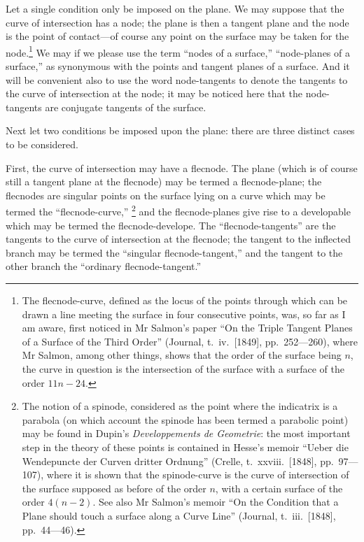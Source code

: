 \documentclass[11pt,a4paper]{book}
\begin{document}
Let a single condition only be imposed on the plane. We may suppose that the curve of intersection has a node; the plane is then a tangent plane and the node is the point of contact---of course any point on the surface may be taken for the node.\footnote{The flecnode-curve, defined as the locus of the points through which can be drawn a line meeting the surface in four consecutive points, was, so far as I am aware, first noticed in Mr Salmon's paper ``On the Triple Tangent Planes of a Surface of the Third Order'' (Journal, t.\ iv.\ [1849], pp.\ 252---260), where Mr Salmon, among other things, shows that the order of the surface being $n$, the curve in question is the intersection of the surface with a surface of the order $11n - 24$.} We may if we please use the term ``nodes of a surface,'' ``node-planes of a surface,'' as synonymous with the points and tangent planes of a surface. And it will be convenient also to use the word node-tangents to denote the tangents to the curve of intersection at the node; it may be noticed here that the node-tangents are conjugate tangents of the surface.

Next let two conditions be imposed upon the plane: there are three distinct cases to be considered.

First, the curve of intersection may have a flecnode. The plane (which is of course still a tangent plane at the flecnode) may be termed a flecnode-plane; the flecnodes are singular points on the surface lying on a curve which may be termed the ``flecnode-curve,''
\footnote{The notion of a spinode, considered as the point where the indicatrix is a parabola (on which account the spinode has been termed a parabolic point) may be found in Dupin's \textit{Developpements de Geometrie}: the most important step in the theory of these points is contained in Hesse's memoir ``Ueber die Wendepuncte der Curven dritter Ordnung'' (Crelle, t.\ xxviii.\ [1848], pp.\ 97---107), where it is shown that the spinode-curve is the curve of intersection of the surface supposed as before of the order $n$, with a certain surface of the order $4(n-2)$. See also Mr Salmon's memoir ``On the Condition that a Plane should touch a surface along a Curve Line'' (Journal, t.\ iii.\ [1848], pp.\ 44---46).}
and the flecnode-planes give rise to a developable which may be termed the flecnode-develope. The ``flecnode-tangents'' are the tangents to the curve of intersection at the flecnode; the tangent to the inflected branch may be termed the ``singular flecnode-tangent,'' and the tangent to the other branch the ``ordinary flecnode-tangent.''
\end{document}
